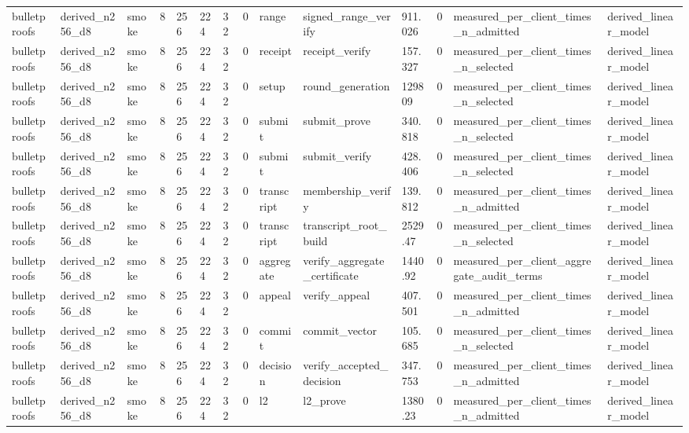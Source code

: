 \begin{table}[t]
\begin{tabular}{llllllllllllll}
bulletproofs & derived\_n256\_d8 & smoke & 8 & 256 & 224 & 32 & 0 & range & signed\_range\_verify & 911.026 & 0 & measured\_per\_client\_times\_n\_admitted & derived\_linear\_model \\
bulletproofs & derived\_n256\_d8 & smoke & 8 & 256 & 224 & 32 & 0 & receipt & receipt\_verify & 157.327 & 0 & measured\_per\_client\_times\_n\_selected & derived\_linear\_model \\
bulletproofs & derived\_n256\_d8 & smoke & 8 & 256 & 224 & 32 & 0 & setup & round\_generation & 129809 & 0 & measured\_per\_client\_times\_n\_selected & derived\_linear\_model \\
bulletproofs & derived\_n256\_d8 & smoke & 8 & 256 & 224 & 32 & 0 & submit & submit\_prove & 340.818 & 0 & measured\_per\_client\_times\_n\_selected & derived\_linear\_model \\
bulletproofs & derived\_n256\_d8 & smoke & 8 & 256 & 224 & 32 & 0 & submit & submit\_verify & 428.406 & 0 & measured\_per\_client\_times\_n\_selected & derived\_linear\_model \\
bulletproofs & derived\_n256\_d8 & smoke & 8 & 256 & 224 & 32 & 0 & transcript & membership\_verify & 139.812 & 0 & measured\_per\_client\_times\_n\_admitted & derived\_linear\_model \\
bulletproofs & derived\_n256\_d8 & smoke & 8 & 256 & 224 & 32 & 0 & transcript & transcript\_root\_build & 2529.47 & 0 & measured\_per\_client\_times\_n\_selected & derived\_linear\_model \\
bulletproofs & derived\_n256\_d8 & smoke & 8 & 256 & 224 & 32 & 0 & aggregate & verify\_aggregate\_certificate & 1440.92 & 0 & measured\_per\_client\_aggregate\_audit\_terms & derived\_linear\_model \\
bulletproofs & derived\_n256\_d8 & smoke & 8 & 256 & 224 & 32 & 0 & appeal & verify\_appeal & 407.501 & 0 & measured\_per\_client\_times\_n\_admitted & derived\_linear\_model \\
bulletproofs & derived\_n256\_d8 & smoke & 8 & 256 & 224 & 32 & 0 & commit & commit\_vector & 105.685 & 0 & measured\_per\_client\_times\_n\_selected & derived\_linear\_model \\
bulletproofs & derived\_n256\_d8 & smoke & 8 & 256 & 224 & 32 & 0 & decision & verify\_accepted\_decision & 347.753 & 0 & measured\_per\_client\_times\_n\_admitted & derived\_linear\_model \\
bulletproofs & derived\_n256\_d8 & smoke & 8 & 256 & 224 & 32 & 0 & l2 & l2\_prove & 1380.23 & 0 & measured\_per\_client\_times\_n\_admitted & derived\_linear\_model \\

\end{tabular}
\end{table}
